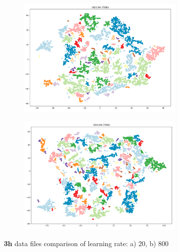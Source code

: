 \begin{figure}[H]
  \centering
  \begin{subfigure}{.5\textwidth}
    \centering
    \includegraphics[width=0.9\textwidth]{./images/tsneParametersTest/learningRate/lr203h-DBSCANCompare.png}
  \end{subfigure}%
  \begin{subfigure}{.5\textwidth}
    \centering
    \includegraphics[width=0.9\textwidth]{./images/tsneParametersTest/learningRate/lr8003h-DBSCANCompare.png}
  \end{subfigure}
	\caption{\textbf{3h} data files comparison of learning rate: a) 20, b) 800}
	\label{figure:3h-learningRateComparison20and800}
\end{figure}


\clearpage